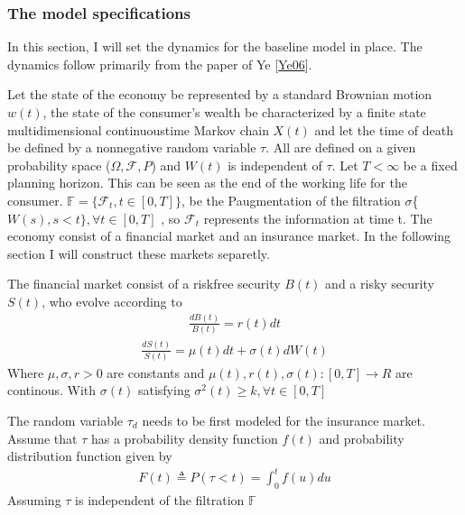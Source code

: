 \documentclass[letterpaper,10pt,english]{jupyterBook}
\begin{document}
\subsubsection{The model specifications}
\label{\detokenize{Financial_application:the-model-specifications}}
\sphinxAtStartPar
In this section, I will set the dynamics for the baseline model in place. The dynamics follow primarily from the paper of Ye {[}\hyperlink{cite.Financial_application:id25}{Ye06}{]}.

\sphinxAtStartPar
Let the state of the economy be represented by a standard Brownian motion \(w(t)\), the state of the consumer’s wealth be characterized by a finite state multi\sphinxhyphen{}dimensional continuous\sphinxhyphen{}time Markov chain \(X(t)\) and let the time of death be defined by a non\sphinxhyphen{}negative random variable \(\tau\). All are defined on a given probability space (\(\Omega, \mathcal{F}, P\)) and \(W(t)\) is independent of \(\tau\). Let \(T< \infty\) be a fixed planning horizon. This can be seen as the end of the working life for the consumer. \(\mathbb{F} = \{\mathcal{F}_t, t \in [0,T]\}\), be the P\sphinxhyphen{}augmentation of the filtration \(\sigma\)\{\(W(s), s<t \}, \forall t \in [0,T]\) , so \(\mathcal{F}_t\) represents the information at time t. The economy consist of a financial market and an insurance market. In the following section I will construct these markets separetly.

\sphinxAtStartPar
The financial market consist of a risk\sphinxhyphen{}free security \(B(t)\) and a risky security \(S(t)\), who evolve according to
\begin{equation*}
\begin{split} \frac{dB(t)}{B(t)}=r(t)dt \end{split}
\end{equation*}\begin{equation*}
\begin{split} \frac{dS(t)}{S(t)}=\mu(t)dt+\sigma(t)dW(t)\end{split}
\end{equation*}
\sphinxAtStartPar
Where \(\mu, \sigma, r > 0\) are constants and \(\mu(t), r(t), \sigma(t): [0,T] \to R\) are continous. With \(\sigma(t)\) satisfying \(\sigma^2(t) \ge k, \forall t \in [0,T]\)

\sphinxAtStartPar
The random variable \(\tau_d\) needs to be first modeled for the insurance  market. Assume that \(\tau\) has a probability density function \(f(t)\) and probability distribution function given by
\begin{equation*}
\begin{split} F(t) \triangleq P(\tau < t) = \int_0^t f(u) du \end{split}
\end{equation*}
\sphinxAtStartPar
Assuming \(\tau\) is independent of the filtration \(\mathbb{F}\)
\end{document}
